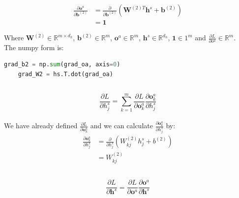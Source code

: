 \documentclass[reqno]{amsart}
\theoremstyle{definition}
\theoremstyle{remark}
\numberwithin{equation}{section}
\begin{document}
\begin{align}
    \frac{\partial \mathbf{o}^a}{\partial \mathbf{b}^{(2)}} &= \frac{\partial}{\partial \mathbf{b}^{(2)}} (\mathbf{W}^{(2)T} \mathbf{h}^s + \mathbf{b}^{(2)}) \\
    &= \mathbf{1}
\end{align}


Where $\mathbf{W}^{(2)} \in \mathbb{R}^{m \times d_h}$, $\mathbf{b}^{(2)} \in \mathbb{R}^{m}$, $\mathbf{o}^{a} \in \mathbb{R}^{m}$, $\mathbf{h}^{s} \in \mathbb{R}^{d_h}$, $\mathbf{1} \in 1^{m}$ and $\frac{\partial L}{\partial o^a}\in \mathbb{R}^{m}$.\\


The numpy form is:

\begin{lstlisting}[language=Python]
    grad_b2 = np.sum(grad_oa, axis=0)
    grad_W2 = hs.T.dot(grad_oa)
\end{lstlisting}

\subsection{}

\begin{equation}
    \frac{\partial L}{\partial h_j^s} = \sum_{k = 1}^m \frac{\partial L}{\partial \mathbf{o}_k^a} \frac{\partial \mathbf{o}_k^a}{\partial h_j^s}
\end{equation}\\

We have already defined $\frac{\partial L}{\partial \mathbf{o}_k^a}$ and we can calculate $\frac{\partial \mathbf{o}_k^a}{\partial h_j^s}$ by:\\

\begin{align}
    \frac{\partial \mathbf{o}_k^a}{\partial h_j^s} &= \frac{\partial}{\partial h_j^s} (W_{kj}^{(2)}h^s_j +b^{(2)})\\
    &= W_{kj}^{(2)}
\end{align}

\subsection{}

\begin{equation}
    \frac{\partial L}{\partial \mathbf{h}^s} = \frac{\partial L}{\partial \mathbf{o}^a} \frac{\partial \mathbf{o}^a}{\partial \mathbf{h}^s}
\end{equation}\\
\end{document}
